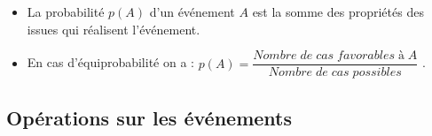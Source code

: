 \documentclass[12pt,a4paper]{article}
\begin{document}
\begin{myprops}
	\begin{itemize}
		 \item La probabilité $p(A)$ d'un événement $A$ est la somme des propriétés des issues qui réalisent l'événement.
		 \item En cas d'équiprobabilité on a : $p(A) = \dfrac{Nombre\;de\; cas\; favorables\; à\; A}{Nombre\; de\; cas\; possibles}$ .
	\end{itemize}
	
\end{myprops}







\subsection{Opérations sur les événements}



	
	
	
\end{document}
